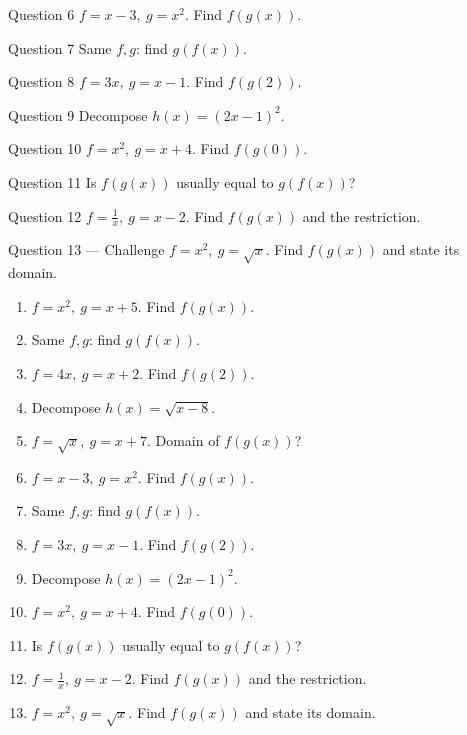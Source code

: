 \documentclass[11pt]{article}
\begin{document}
\begin{qbox}{Question 6}
$f=x-3,\ g=x^2$. Find $f(g(x))$.\workspace{2.4cm}
\end{qbox}

\begin{qbox}{Question 7}
Same $f,g$: find $g(f(x))$.\workspace{2.4cm}
\end{qbox}

\begin{qbox}{Question 8}
$f=3x,\ g=x-1$. Find $f(g(2))$.\workspace{2.4cm}
\end{qbox}

\begin{qbox}{Question 9}
Decompose $h(x)=(2x-1)^2$.\workspace{2.4cm}
\end{qbox}

\begin{qbox}{Question 10}
$f=x^2,\ g=x+4$. Find $f(g(0))$.\workspace{2.4cm}
\end{qbox}

\begin{qbox}{Question 11}
Is $f(g(x))$ usually equal to $g(f(x))$?\workspace{2.4cm}
\end{qbox}

\begin{qbox}{Question 12}
$f=\tfrac1x,\ g=x-2$. Find $f(g(x))$ and the restriction.\workspace{2.4cm}
\end{qbox}

\begin{qbox}{Question 13 --- Challenge}
$f=x^2,\ g=\sqrt x$. Find $f(g(x))$ and state its domain.\workspace{3cm}
\end{qbox}

\clearpage
{}

\begin{recapbox}
\begin{multicols}{2}
\small
\begin{enumerate}[leftmargin=*,itemsep=3pt]
  \item $f=x^2,\ g=x+5$. Find $f(g(x))$.
  \item Same $f,g$: find $g(f(x))$.
  \item $f=4x,\ g=x+2$. Find $f(g(2))$.
  \item Decompose $h(x)=\sqrt{x-8}$.
  \item $f=\sqrt x,\ g=x+7$. Domain of $f(g(x))$?
  \item $f=x-3,\ g=x^2$. Find $f(g(x))$.
  \item Same $f,g$: find $g(f(x))$.
  \item $f=3x,\ g=x-1$. Find $f(g(2))$.
  \item Decompose $h(x)=(2x-1)^2$.
  \item $f=x^2,\ g=x+4$. Find $f(g(0))$.
  \item Is $f(g(x))$ usually equal to $g(f(x))$?
  \item $f=\tfrac1x,\ g=x-2$. Find $f(g(x))$ and the restriction.
  \item $f=x^2,\ g=\sqrt x$. Find $f(g(x))$ and state its domain.
\end{enumerate}
\end{multicols}
\end{recapbox}
\end{document}
